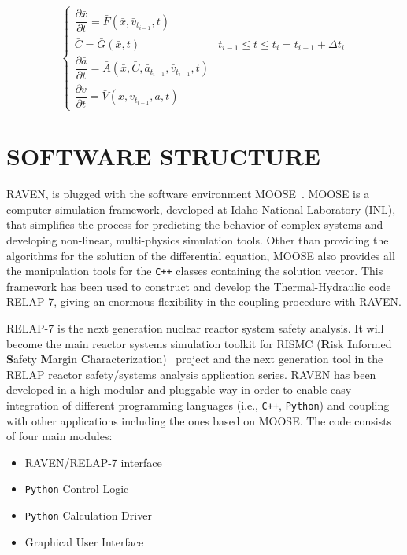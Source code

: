 \documentclass{anstrans}
\begin{document}
\begin{equation}
\begin{cases}
\dfrac{\partial \bar{x}}{\partial t} = \bar{F}(\bar{x},\bar{v}_{t_{i-1}},t) \\
\bar{C} = \bar{G}(\bar{x},t) & t_{i-1}\leq t\leq t_{i} = t_{i-1} + \Delta t_{i}\\
\dfrac{\partial \bar{a}}{\partial t} = \bar{A}(\bar{x},\bar{C},\bar{a}_{t_{i-1}},\bar{v}_{t_{i-1}},t) \\
\dfrac{\partial \bar{v}}{\partial t} = \bar{V}(\bar{x},\bar{v}_{t_{i-1}},\bar{a},t)
\end{cases}
\label{eq:generalSystemEquationwithControlSplittingAndAux}
\end{equation}


\section{SOFTWARE STRUCTURE}
RAVEN, is plugged with the software environment MOOSE~\cite{MOOSE}. MOOSE is a computer simulation framework,  developed at Idaho National Laboratory (INL), that simplifies the process for predicting the behavior of complex systems and developing non-linear, multi-physics simulation tools. Other than providing the algorithms for the solution of the differential equation, MOOSE also provides all the manipulation tools for the \verb!C++! classes containing the solution vector. This framework has been used to construct and develop the Thermal-Hydraulic code RELAP-7, giving an enormous flexibility in the coupling procedure with RAVEN.

RELAP-7 is the next generation nuclear reactor system safety analysis. It will become the main reactor systems simulation toolkit for RISMC (\textbf{R}isk \textbf{I}nformed \textbf{S}afety \textbf{M}argin \textbf{C}haracterization)~\cite{mandelliANS_RISMC} project and the next generation tool in the RELAP reactor safety/systems analysis application series.
RAVEN has been developed in a high modular and pluggable way in order to enable easy integration of different programming languages (i.e., \verb!C++!, \verb!Python!) and coupling with other applications including the ones based on MOOSE. The code consists of four main modules:
\begin{itemize}
\item RAVEN/RELAP-7 interface
\item \verb!Python! Control Logic
\item \verb!Python! Calculation Driver
\item Graphical User Interface
\end{itemize}
\end{document}
